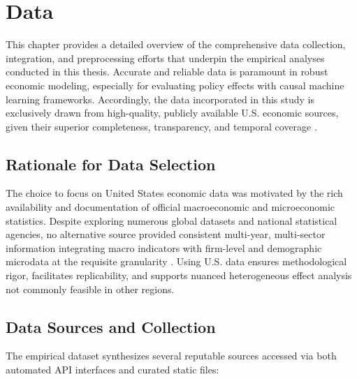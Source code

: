 \section{Data}\label{sec:data}

This chapter provides a detailed overview of the comprehensive data collection, integration, and preprocessing efforts that underpin the empirical analyses conducted in this thesis. Accurate and reliable data is paramount in robust economic modeling, especially for evaluating policy effects with causal machine learning frameworks. Accordingly, the data incorporated in this study is exclusively drawn from high-quality, publicly available U.S. economic sources, given their superior completeness, transparency, and temporal coverage \citep{bareinboim2023, bankofcanada2023}.

\subsection{Rationale for Data Selection}

The choice to focus on United States economic data was motivated by the rich availability and documentation of official macroeconomic and microeconomic statistics. Despite exploring numerous global datasets and national statistical agencies, no alternative source provided consistent multi-year, multi-sector information integrating macro indicators with firm-level and demographic microdata at the requisite granularity \citep{garcia2020, imf2023}. Using U.S. data ensures methodological rigor, facilitates replicability, and supports nuanced heterogeneous effect analysis not commonly feasible in other regions.

\subsection{Data Sources and Collection}\label{subsec:data_sources}

The empirical dataset synthesizes several reputable sources accessed via both automated API interfaces and curated static files:

